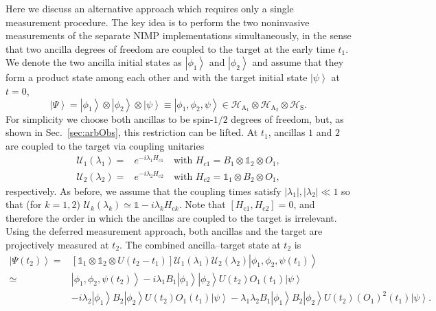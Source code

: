 \documentclass[epjST,numbook]{svjour}
\newcommand{\couple}{\mathscr{U}}
\newcommand{\ket}[1]{\left \vert #1 \right >}
\begin{document}
Here we discuss an alternative approach which requires only a single measurement procedure. The key idea is to perform the two noninvasive measurements of the separate NIMP implementations simultaneously, in the sense that two ancilla degrees of freedom are coupled to the target at the early time $t_1$. We denote the two ancilla initial states as $\ket{\phi_1}$ and $\ket{\phi_2}$ and assume that they form a product state among each other and with the target initial state $\ket{\psi}$ at $t=0$,
\begin{equation}
	\ket{\Psi} = \ket{\phi_1}\otimes \ket{\phi_2}\otimes \ket{\psi} \equiv \ket{\phi_1,\phi_2,\psi} \in \mathscr{H}_{\text{A}_1}\otimes\mathscr{H}_{\text{A}_2}\otimes\mathscr{H}_\text{S}.
\end{equation}
For simplicity we choose both ancillas to be spin-$1/2$ degrees of freedom, but, as shown in Sec.~\ref{sec:arbObs}, this restriction can be lifted. At $t_1$, ancillas $1$ and $2$ are coupled to the target via coupling unitaries
\begin{equation}\label{e:simCouple}
	\begin{split}
		\couple_1(\lambda_1)=&e^{-i\lambda_1 H_{\text{c}1}} \quad\text{with $H_{\text{c}1} = B_1\otimes\mathds{1}_2\otimes O_1$},\\
		\couple_2(\lambda_2)=&e^{-i\lambda_2 H_{\text{c}2}} \quad\text{with $H_{\text{c}2} = \mathds{1}_1\otimes B_2\otimes O_1$},
	\end{split}
\end{equation}
respectively. As before, we assume that the coupling times satisfy $|\lambda_1|,|\lambda_2|\ll 1$ so that (for $k=1,2$) ${\couple_k(\lambda_k) \simeq \mathds{1}-i\lambda_k  H_{\text{c}k}}$.
Note that $\left[ H_{\text{c}1}, H_{\text{c}2}\right]=0$, and therefore the order in which the ancillas are coupled to the target is irrelevant. Using the deferred measurement approach, both ancillas and the target are projectively measured at $t_2$. The combined ancilla--target state at $t_2$ is
\begin{equation}
	\begin{split}
		\ket{\Psi(t_2)} =& [\mathds{1}_1\otimes\mathds{1}_2\otimes U(t_2-t_1)]\couple_1(\lambda_1)\couple_2(\lambda_2) \ket{\phi_1,\phi_2,\psi(t_1)} \\
		\simeq& \ket{\phi_1,\phi_2,\psi(t_2)} -i\lambda_1 B_1\ket{\phi_1}\ket{\phi_2}U(t_2)O_1(t_1)\ket{\psi} \\
		&-i\lambda_2 \ket{\phi_1}B_2\ket{\phi_2}U(t_2)O_1(t_1)\ket{\psi} -\lambda_1\lambda_2 B_1\ket{\phi_1}B_2\ket{\phi_2}U(t_2)(O_1 )^2(t_1)\ket{\psi} .
	\end{split}
\end{equation}
\end{document}
